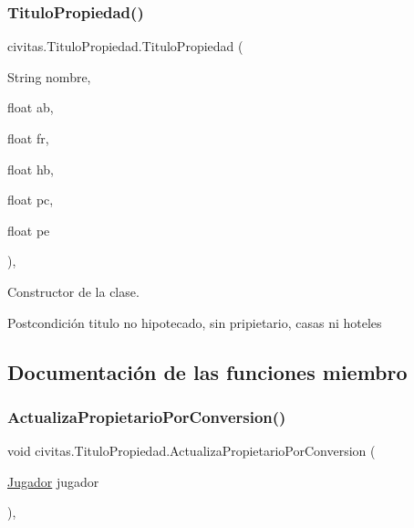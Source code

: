 \subsubsection{\texorpdfstring{Titulo\+Propiedad()}{TituloPropiedad()}}
{\footnotesize\ttfamily civitas.\+Titulo\+Propiedad.\+Titulo\+Propiedad (\begin{DoxyParamCaption}\item[{String}]{nombre,  }\item[{float}]{ab,  }\item[{float}]{fr,  }\item[{float}]{hb,  }\item[{float}]{pc,  }\item[{float}]{pe }\end{DoxyParamCaption})\hspace{0.3cm}{\ttfamily [inline]}, {\ttfamily [package]}}

Constructor de la clase. \begin{DoxyPostcond}{Postcondición}
titulo no hipotecado, sin pripietario, casas ni hoteles 
\end{DoxyPostcond}


\subsection{Documentación de las funciones miembro}
\mbox{\label{classcivitas_1_1TituloPropiedad_a4f7d2ebddd0012032245a7e1c52b6334}} 
\subsubsection{\texorpdfstring{Actualiza\+Propietario\+Por\+Conversion()}{ActualizaPropietarioPorConversion()}}
{\footnotesize\ttfamily void civitas.\+Titulo\+Propiedad.\+Actualiza\+Propietario\+Por\+Conversion (\begin{DoxyParamCaption}\item[{\hyperlink{classcivitas_1_1Jugador}{Jugador}}]{jugador }\end{DoxyParamCaption})\hspace{0.3cm}{\ttfamily [inline]}, {\ttfamily [package]}}

